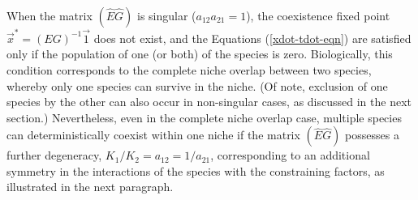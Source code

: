 When the matrix $(\hat{E}\hat{G})$ is singular ($a_{12}a_{21}=1$), the coexistence fixed point $\vec{x}^* = (E G)^{-1}\vec{1}$ does not exist, and the Equations (\ref{xdot-tdot-eqn}) are satisfied only if the population of one (or both) of the species is zero. %
Biologically, this condition corresponds to the complete niche overlap between two species, whereby only one species can survive in the niche. 
(Of note, exclusion of one species by the other can also occur in non-singular cases, as discussed in the next section.) 
Nevertheless, even in the complete niche overlap case, multiple species can deterministically coexist within one niche if the matrix $(\hat{E}\hat{G})$ possesses a further degeneracy, $K_1/K_2=a_{12}=1/a_{21}$, corresponding to an additional symmetry in the interactions of the species with the constraining factors, as illustrated in the next paragraph. %

